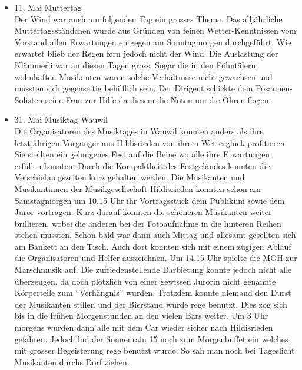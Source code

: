 \begin{history}
\begin{itemize}
            \item 11. Mai Muttertag\\
                  Der Wind war auch am folgenden Tag ein grosses Thema. Das alljährliche
                  Muttertagsständchen wurde aus Gründen von feinen Wetter-Kenntnissen vom
                  Vorstand allen Erwartungen entgegen am Sonntagmorgen durchgeführt. Wie
                  erwartet blieb der Regen fern jedoch nicht der Wind. Die Auslastung der
                  Klämmerli war an diesen Tagen gross. Sogar die in den Föhntälern
                  wohnhaften Musikanten waren solche Verhältnisse nicht gewachsen und
                  mussten sich gegenseitig behilflich sein. Der Dirigent schickte dem
                  Posaunen-Solisten seine Frau zur Hilfe da diesem die Noten um die Ohren
                  flogen.

            \item 31. Mai Musiktag Wauwil\\
                  Die Organisatoren des Musiktages in Wauwil konnten anders als ihre
                  letztjährigen  Vorgänger aus Hildisrieden von ihrem Wetterglück
                  profitieren. Sie stellten ein gelungenes Fest auf die Beine wo alle ihre
                  Erwartungen erfüllen konnten. Durch die Kompaktheit des Festgeländes
                  konnten die Verschiebungszeiten kurz gehalten werden. Die Musikanten und
                  Musikantinnen der Musikgesellschaft Hildisrieden konnten schon am
                  Samstagmorgen um 10.15 Uhr ihr Vortragsstück dem Publikum sowie dem
                  Juror vortragen. Kurz darauf konnten die schöneren Musikanten weiter
                  brillieren, wobei die anderen bei der Fotoaufnahme in die hinteren
                  Reihen stehen mussten. Schon bald war dann auch Mittag und allesamt
                  gesellten sich am Bankett an den Tisch. Auch dort konnten sich mit einem
                  zügigen Ablauf die Organisatoren und Helfer auszeichnen. Um 14.15 Uhr
                  spielte die MGH zur Marschmusik auf. Die zufriedenstellende Darbietung
                  konnte jedoch nicht alle überzeugen, da doch plötzlich von einer
                  gewissen Jurorin nicht genannte Körperteile zum \enquote{Verhängnis}
                  wurden. Trotzdem konnte niemand den Durst der Musikanten stillen und der
                  Bierstand wurde rege benutzt. Dies zog sich bis in die frühen
                  Morgenstunden an den vielen Bars weiter.  Um 3 Uhr morgens wurden dann
                  alle mit dem Car wieder sicher nach Hildisrieden gefahren. Jedoch lud
                  der Sonnenrain 15 noch zum Morgenbuffet ein welches mit grosser
                  Begeisterung rege benutzt wurde. So sah man noch bei Tageslicht
                  Musikanten durchs Dorf ziehen.


\end{itemize}
\end{history}
